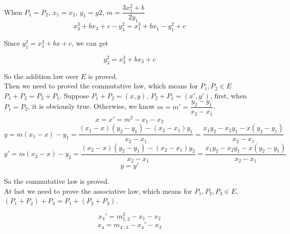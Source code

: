 \documentclass{article}
\begin{document}
When $P_1=P_2$, $x_1=x_2$, $y_1=y2$, $m=\dfrac{3x_1^2+b}{2y_1}$
$$x_3^3+bx_3+c-y_3^2=x_1^3 + bx_1 - y_1^2 + c$$

Since $y_1^2=x_1^3+bx+c$, we can get

$$y_3^2=x_3^3+bx_3+c$$

So the addition law over $E$ is proved.\\

Then we need to proved the commutative law, which means for $P_1,P_2\in E$ $P_1+P_2=P_2+P_1$. Suppose $P_1+P_2=(x,y)$, $P_2+P_1=(x',y')$, 
first, when $P_1=P_2$, it is obviously true. Otherwise, we know $m=m'=\dfrac{y_2-y_1}{x_2-x_1}$.
$$x=x'=m^2-x_1-x_2$$
$$y=m(x_1-x)-y_1=\frac{(x_1-x)(y_2-y_1)-(x_2-x_1)y_1}{x_2-x_1}=\frac{x_1y_2-x_2y_1-x(y_2-y_1)}{x_2-x_1}$$
$$y'=m(x_2-x)-y_2=\frac{(x_2-x)(y_2-y_1)-(x_2-x_1)y_2}{x_2-x_1}=\frac{x_1y_2-x_2y_1-x(y_2-y_1)}{x_2-x_1}$$
$$y=y'$$

So the commutative law is proved. \\

At last we need to prove the associative law, which means for $P_1,P_2,P_3\in E$, $(P_1+P_2)+P_3=P_1+(P_2+P_3)$.

$$x_4'=m_{1,2}^2-x_1-x_2$$
$$x_4=m_{4',3}-x_4'-x_3$$
\end{document}
